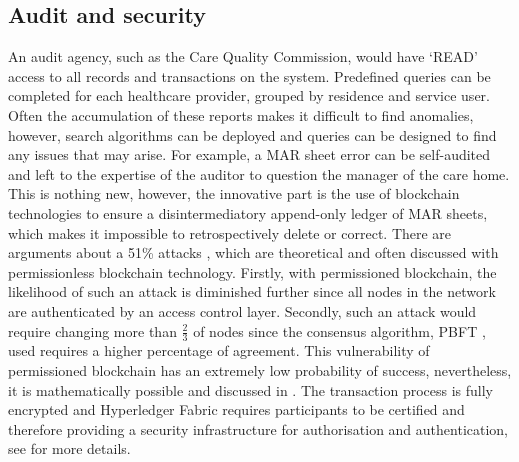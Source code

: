 \documentclass[runningheads]{llncs}
\begin{document}
\subsection{Audit and security}\label{sec:audits}
An audit agency, such as the Care Quality Commission, would have `READ' access to all records and transactions on the system. Predefined queries can be completed for each healthcare provider, grouped by residence and service user. Often the accumulation of these reports makes it difficult to find anomalies, however, search algorithms can be deployed and queries can be designed to find any issues that may arise. For example, a MAR sheet error can be self-audited and left to the expertise of the auditor to question the manager of the care home. This is nothing new, however, the innovative part is the use of blockchain technologies to ensure a disintermediatory append-only ledger of MAR sheets, which makes it impossible to retrospectively delete or correct. There are arguments about a 51\% attacks \cite{bastiaan2015preventing}, which are theoretical and often discussed with permissionless blockchain technology. Firstly, with permissioned blockchain, the likelihood of such an attack is diminished further since all nodes in the network are authenticated by an access control layer. Secondly, such an attack would require changing more than $\frac{2}{3}$ of nodes since the consensus algorithm, PBFT \cite{castro1999practical}, used requires a higher percentage of agreement. 
This vulnerability of permissioned blockchain has an extremely low probability of success, nevertheless, it is mathematically possible and discussed in \cite{zyskind2015decentralizing}. The transaction process is fully encrypted and Hyperledger Fabric requires participants to be certified and therefore providing a security infrastructure for authorisation and authentication, see \cite{cachin2016architecture} for more details. 


\end{document}

